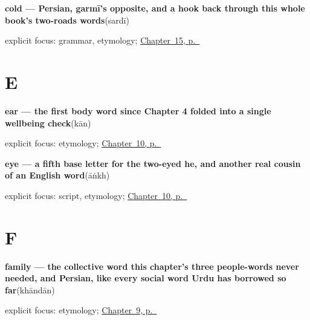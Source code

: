 \noindent\begin{minipage}[t]{\linewidth}
\raggedright
\textbf{cold — Persian, garmī's opposite, and a hook back through this whole book's two-roads words}\enspace\emph{}\enspace(sardī)\par
\footnotesize explicit focus: grammar, etymology; \hyperref[ch:ur-weather]{Chapter~15, p.~\pageref*{ch:ur-weather}}
\end{minipage}\par\smallskip

\section*{E}

\noindent\begin{minipage}[t]{\linewidth}
\raggedright
\textbf{ear — the first body word since Chapter 4 folded    into a single wellbeing check}\enspace\emph{}\enspace(kān)\par
\footnotesize explicit focus: etymology; \hyperref[ch:ur-face-words]{Chapter~10, p.~\pageref*{ch:ur-face-words}}
\end{minipage}\par\smallskip

\noindent\begin{minipage}[t]{\linewidth}
\raggedright
\textbf{eye — a fifth base letter for the two-eyed he, and another real cousin of an English word}\enspace\emph{}\enspace(āṅkh)\par
\footnotesize explicit focus: script, etymology; \hyperref[ch:ur-face-words]{Chapter~10, p.~\pageref*{ch:ur-face-words}}
\end{minipage}\par\smallskip

\section*{F}

\noindent\begin{minipage}[t]{\linewidth}
\raggedright
\textbf{family — the collective word this chapter's three people-words never needed, and Persian, like every social word Urdu has borrowed so far}\enspace\emph{}\enspace(khāndān)\par
\footnotesize explicit focus: etymology; \hyperref[ch:ur-people]{Chapter~9, p.~\pageref*{ch:ur-people}}
\end{minipage}\par\smallskip


